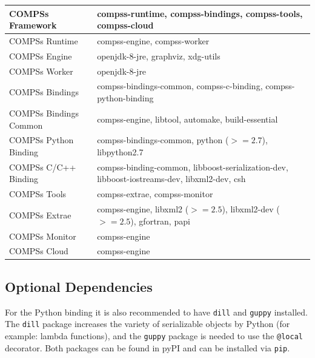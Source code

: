 \bgroup
  \def\arraystretch{1.5}
  \begin{center}
    \begin{tabular}{ p{6cm} | p{10cm} }
    COMPSs Framework 		& compss-runtime, compss-bindings, compss-tools, compss-cloud \\ \hline 
    COMPSs Runtime 		& compss-engine, compss-worker \\ \hline  
    COMPSs Engine 		& openjdk-8-jre, graphviz, xdg-utils \\ \hline 
    COMPSs Worker 		& openjdk-8-jre \\ \hline 
    COMPSs Bindings 		& compss-bindings-common, compss-c-binding, compss-python-binding \\ \hline 
    COMPSs Bindings Common 	& compss-engine, libtool, automake, build-essential \\ \hline 
    COMPSs Python Binding 	& compss-bindings-common, python ($>= 2.7$), libpython2.7 \\ \hline 
    COMPSs C/C++ Binding 	& compss-binding-common, libboost-serialization-dev, libboost-iostreams-dev, libxml2-dev, csh \\ \hline 
    COMPSs Tools 		& compss-extrae, compss-monitor \\ \hline 
    COMPSs Extrae 		& compss-engine, libxml2 ($>= 2.5$), libxml2-dev ($>= 2.5$), gfortran, papi \\ \hline 
    COMPSs Monitor 		& compss-engine \\ \hline 
    COMPSs Cloud 		& compss-engine    
    \end{tabular}
  \end{center}
\egroup

\subsection{Optional Dependencies}
For the Python binding it is also recommended to have \verb|dill| and \verb|guppy| installed. The \verb|dill| package increases
the variety of serializable objects by Python (for example: lambda functions), and the \verb|guppy| package is needed to use the \verb|@local|
decorator. Both packages can be found in pyPI and can be installed via \verb|pip|.
